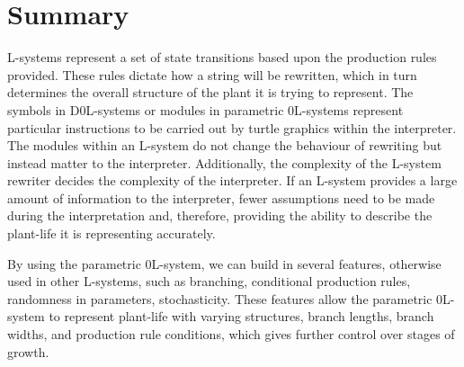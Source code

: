 \section{Summary}

L-systems represent a set of state transitions based upon the production rules provided. These rules dictate how a string will be rewritten, which in turn determines the overall structure of the plant it is trying to represent. The symbols in D0L-systems or modules in parametric 0L-systems represent particular instructions to be carried out by turtle graphics within the interpreter. The modules within an L-system do not change the behaviour of rewriting but instead matter to the interpreter. Additionally, the complexity of the L-system rewriter decides the complexity of the interpreter. If an L-system provides a large amount of information to the interpreter, fewer assumptions need to be made during the interpretation and, therefore, providing the ability to describe the plant-life it is representing accurately.

By using the parametric 0L-system, we can build in several features, otherwise used in other L-systems, such as branching, conditional production rules, randomness in parameters, stochasticity. These features allow the parametric 0L-system to represent plant-life with varying structures, branch lengths, branch widths, and production rule conditions, which gives further control over stages of growth.

